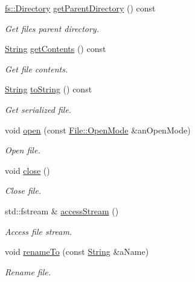 \begin{DoxyCompactItemize}
\hyperlink{classostk_1_1core_1_1fs_1_1_directory}{fs\+::\+Directory} \hyperlink{classostk_1_1core_1_1fs_1_1_file_a90626395dbeab369d76255556600c7cc}{get\+Parent\+Directory} () const
\begin{DoxyCompactList}\small\item\em Get file\textquotesingle{}s parent directory. \end{DoxyCompactList}\item 
\hyperlink{classostk_1_1core_1_1types_1_1_string}{String} \hyperlink{classostk_1_1core_1_1fs_1_1_file_a4ce7db90e409818e3c4d2b27884260cf}{get\+Contents} () const
\begin{DoxyCompactList}\small\item\em Get file contents. \end{DoxyCompactList}\item 
\hyperlink{classostk_1_1core_1_1types_1_1_string}{String} \hyperlink{classostk_1_1core_1_1fs_1_1_file_af3fc4659467e9eba1a7faff578abdbab}{to\+String} () const
\begin{DoxyCompactList}\small\item\em Get serialized file. \end{DoxyCompactList}\item 
void \hyperlink{classostk_1_1core_1_1fs_1_1_file_a3d5b7ddfa15dde13573f904900cd84e6}{open} (const \hyperlink{classostk_1_1core_1_1fs_1_1_file_aef3d3e622ef15381a9f48c161e134da5}{File\+::\+Open\+Mode} \&an\+Open\+Mode)
\begin{DoxyCompactList}\small\item\em Open file. \end{DoxyCompactList}\item 
void \hyperlink{classostk_1_1core_1_1fs_1_1_file_a1673393d876005d7eae90e435584ea38}{close} ()
\begin{DoxyCompactList}\small\item\em Close file. \end{DoxyCompactList}\item 
std\+::fstream \& \hyperlink{classostk_1_1core_1_1fs_1_1_file_a0a6494f47ca7384d29f6b318d0380dfc}{access\+Stream} ()
\begin{DoxyCompactList}\small\item\em Access file stream. \end{DoxyCompactList}\item 
void \hyperlink{classostk_1_1core_1_1fs_1_1_file_ab1afed5cc78b78359201b587a4b63307}{rename\+To} (const \hyperlink{classostk_1_1core_1_1types_1_1_string}{String} \&a\+Name)
\begin{DoxyCompactList}\small\item\em Rename file. \end{DoxyCompactList}\item 

\end{DoxyCompactItemize}
